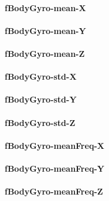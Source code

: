 \documentclass[
]{article}
\begin{document}
\hypertarget{fbodygyro-mean-x}{%
\paragraph{fBodyGyro-mean-X}\label{fbodygyro-mean-x}}

\hypertarget{fbodygyro-mean-y}{%
\paragraph{fBodyGyro-mean-Y}\label{fbodygyro-mean-y}}

\hypertarget{fbodygyro-mean-z}{%
\paragraph{fBodyGyro-mean-Z}\label{fbodygyro-mean-z}}

\hypertarget{fbodygyro-std-x}{%
\paragraph{fBodyGyro-std-X}\label{fbodygyro-std-x}}

\hypertarget{fbodygyro-std-y}{%
\paragraph{fBodyGyro-std-Y}\label{fbodygyro-std-y}}

\hypertarget{fbodygyro-std-z}{%
\paragraph{fBodyGyro-std-Z}\label{fbodygyro-std-z}}

\hypertarget{fbodygyro-meanfreq-x}{%
\paragraph{fBodyGyro-meanFreq-X}\label{fbodygyro-meanfreq-x}}

\hypertarget{fbodygyro-meanfreq-y}{%
\paragraph{fBodyGyro-meanFreq-Y}\label{fbodygyro-meanfreq-y}}

\hypertarget{fbodygyro-meanfreq-z}{%
\paragraph{fBodyGyro-meanFreq-Z}\label{fbodygyro-meanfreq-z}}
\end{document}
